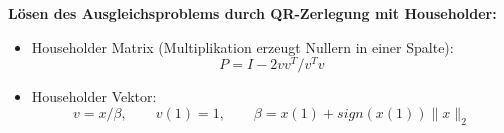 \documentclass[a4paper]{article}
\begin{document}
{\bf Lösen des Ausgleichsproblems durch QR-Zerlegung mit Householder:}
\begin{itemize}
\item Householder Matrix (Multiplikation erzeugt Nullern in einer Spalte):
  \begin{equation*}
    P = I - 2vv^T / v^Tv
  \end{equation*}
\item Householder Vektor:
  \begin{equation*}
    v = x / \beta,\qquad v(1) = 1, \qquad \beta = x(1) + sign(x(1)) \|x\|_2
  \end{equation*}
\end{itemize}



\end{document}
